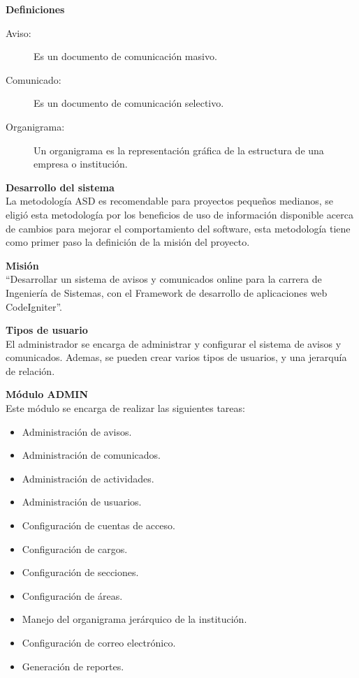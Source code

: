 \documentclass[10pt,letterpaper,twoside]{article}
\newcommand{\btext}[1]{
    \vspace{10mm}
    {{\textcolor{titlecolor}{\large{\textbf{\textsf{#1}}}}}}
    \vspace{5mm}
    \\
}
\begin{document}
\begin{multicols}{2}
\btext{Definiciones}
\begin{description}
    \item [Aviso:] Es un documento de comunicación masivo.
    \item [Comunicado:] Es un documento de comunicación selectivo.
    \item [Organigrama:] Un organigrama es la representación gráfica de la estructura de una empresa o institución.
\end{description}

\btext{Desarrollo del sistema}
La metodología ASD es recomendable para proyectos pequeños medianos, se eligió esta metodología por los beneficios de uso de información disponible acerca de cambios para mejorar el comportamiento del software, esta metodología tiene como primer paso la definición de la misión del proyecto.

\btext{Misión}
“Desarrollar un sistema de avisos y comunicados online para la carrera de Ingeniería de Sistemas, con el Framework de desarrollo de aplicaciones web CodeIgniter”.

\btext{Tipos de usuario}
El administrador se encarga de administrar y configurar el sistema de avisos y comunicados. Ademas, se pueden crear varios tipos de usuarios, y una jerarquía de relación.

\btext{Módulo ADMIN}
Este módulo se encarga de realizar las siguientes tareas:
\begin{itemize}
    \item Administración de avisos.
    \item Administración de comunicados.
    \item Administración de actividades.
    \item Administración de usuarios.
    \item Configuración de cuentas de acceso.
    \item Configuración de cargos.
    \item Configuración de secciones.
    \item Configuración de áreas.
    \item Manejo del organigrama jerárquico de la institución.
    \item Configuración de correo electrónico.
    \item Generación de reportes.
\end{itemize}


\end{multicols}
\end{document}
